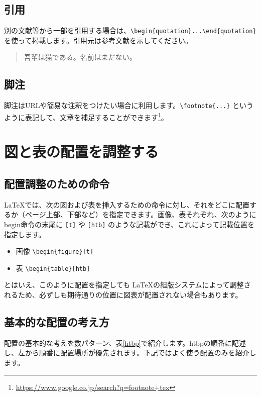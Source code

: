 \subsection{引用}
別の文献等から一部を引用する場合は、\verb=\begin{quotation}...\end{quotation}=を使って掲載します。引用元は参考文献を示してください。

\begin{quotation}
  吾輩は猫である。名前はまだない。
\end{quotation}

\subsection{脚注}
脚注はURLや簡易な注釈をつけたい場合に利用します。\verb=\footnote{...}= というように表記して、文章を補足することができます\footnote{\url{https://www.google.co.jp/search?q=footnote+tex}}。

\section{図と表の配置を調整する}
\subsection{配置調整のための命令}
\LaTeX では、次の図および表を挿入するための命令に対し、それをどこに配置するか（ページ上部、下部など）を指定できます。画像、表それぞれ、次のようにbegin命令の末尾に \verb=[t]= や \verb=[htb]= のような記載ができ、これによって記載位置を指定します。

\begin{itemize}
    \item 画像  \verb=\begin{figure}[t]= 
    \item 表 \verb=\begin{table}[htb]= 
\end{itemize}

とはいえ、このように配置を指定しても \LaTeX の組版システムによって調整されるため、必ずしも期待通りの位置に図表が配置されない場合もあります。

\subsection{基本的な配置の考え方}
配置の基本的な考えを数パターン、表\ref{htbp}で紹介します。htbpの順番に記述し、左から順番に配置場所が優先されます。下記ではよく使う配置のみを紹介します。

